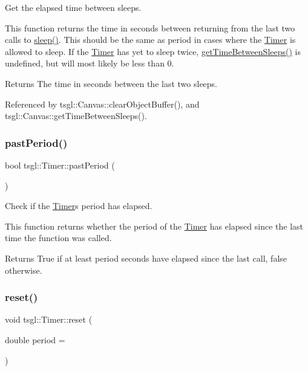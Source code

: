 Get the elapsed time between sleeps. 

This function returns the time in seconds between returning from the last two calls to \hyperlink{classtsgl_1_1_timer_a5c6e0dca6793d48c675e05b983da7f07}{sleep()}. This should be the same as {\ttfamily period} in cases where the \hyperlink{classtsgl_1_1_timer}{Timer} is allowed to sleep. If the \hyperlink{classtsgl_1_1_timer}{Timer} has yet to sleep twice, \hyperlink{classtsgl_1_1_timer_a1ade9f9a03047e2604622bf4ae16347b}{get\+Time\+Between\+Sleeps()} is undefined, but will most likely be less than 0. \begin{DoxyReturn}{Returns}
The time in seconds between the last two sleeps. 
\end{DoxyReturn}


Referenced by tsgl\+::\+Canvas\+::clear\+Object\+Buffer(), and tsgl\+::\+Canvas\+::get\+Time\+Between\+Sleeps().

\mbox{\label{classtsgl_1_1_timer_ac7c908b06a735f09841367c7067f44dd}} 
\subsubsection{\texorpdfstring{past\+Period()}{pastPeriod()}}
{\footnotesize\ttfamily bool tsgl\+::\+Timer\+::past\+Period (\begin{DoxyParamCaption}{ }\end{DoxyParamCaption})}



Check if the \hyperlink{classtsgl_1_1_timer}{Timer}\textquotesingle{}s period has elapsed. 

This function returns whether the period of the \hyperlink{classtsgl_1_1_timer}{Timer} has elapsed since the last time the function was called. \begin{DoxyReturn}{Returns}
True if at least {\ttfamily period} seconds have elapsed since the last call, false otherwise. 
\end{DoxyReturn}
\mbox{\label{classtsgl_1_1_timer_a67a01c03c033c52056b7f1c733cd93e4}} 
\subsubsection{\texorpdfstring{reset()}{reset()}}
{\footnotesize\ttfamily void tsgl\+::\+Timer\+::reset (\begin{DoxyParamCaption}\item[{double}]{period = {} }\end{DoxyParamCaption})}



